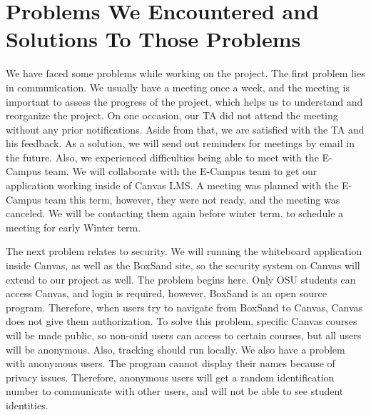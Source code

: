 \documentclass[onecolumn, draftclsnofoot,10pt, compsoc]{IEEEtran}
\begin{document}
\section{Problems We Encountered and Solutions To Those Problems}
We have faced some problems while working on the project. The first problem lies in communication. We usually have a meeting once a week, and the meeting is important to assess the progress of the project, which helps us to understand and reorganize the project. On one occasion, our TA did not attend the meeting without any prior notifications. Aside from that, we are satisfied with the TA and his feedback. As a solution, we will send out reminders for meetings by email in the future. Also, we experienced difficulties being able to meet with the E-Campus team. We will collaborate with the E-Campus team to get our application working inside of Canvas LMS. A meeting was planned with the E-Campus team this term, however, they were not ready, and the meeting was canceled. We will be contacting them again before winter term, to schedule a meeting for early Winter term.

The next problem relates to security. We will running the whiteboard application inside Canvas, as well as the BoxSand site, so the security system on Canvas will extend to our project as well. The problem begins here. Only OSU students can access Canvas, and login is required, however, BoxSand is an open source program. Therefore, when users try to navigate from BoxSand to Canvas, Canvas does not give them authorization. To solve this problem, specific Canvas courses will be made public, so non-onid users can access to certain courses, but all users will be anonymous. Also, tracking should run locally. We also have a problem with anonymous users. The program cannot display their names because of privacy issues. Therefore, anonymous users will get a random identification number to communicate with other users, and will not be able to see student identities.
\end{document}
